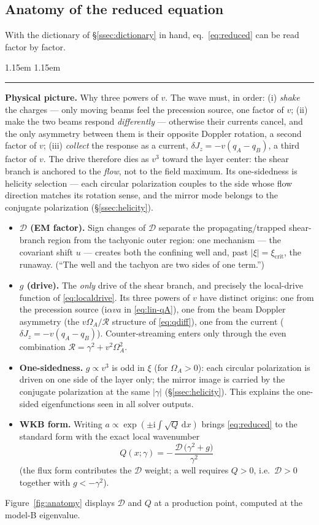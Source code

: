 \documentclass[11pt,a4paper]{article}
\numberwithin{equation}{section}
\theoremstyle{remark}
\newenvironment{intuition}%
{\par\medskip\noindent
 \begin{list}{}{\leftmargin 1.15em \rightmargin 1.15em \listparindent 0pt
 \itemindent 0pt \parsep 2pt \topsep 2pt}\item\relax
 \small\textcolor{intu}{\rule[-0.6ex]{2.6pt}{2.4ex}}\hspace{0.55em}%
 \textcolor{intu}{\textbf{Physical picture.}}\hspace{0.5em}\ignorespaces}%
{\end{list}\medskip}
\newcommand{\OmA}{\Omega_A}
\newcommand{\D}{\mathcal{D}}
\newcommand{\R}{\mathcal{R}}
\newcommand{\dd}{\mathrm{d}}
\newcommand{\ii}{\mathrm{i}}
\begin{document}
\subsection{Anatomy of the reduced equation}
\label{ssec:anatomy}

With the dictionary of \S\ref{ssec:dictionary} in hand,
eq.~\eqref{eq:reduced} can be read factor by factor.

\begin{intuition}
Why three powers of $v$. The wave must, in order: (i) \emph{shake} the
charges --- only moving beams feel the precession source, one factor of
$v$; (ii) make the two beams respond \emph{differently} --- otherwise
their currents cancel, and the only asymmetry between them is their
opposite Doppler rotation, a second factor of $v$; (iii) \emph{collect}
the response as a current, $\delta J_z=-v(q_A-q_B)$, a third factor of
$v$. The drive therefore dies as $v^3$ toward the layer center: the shear
branch is anchored to the \emph{flow}, not to the field maximum. Its
one-sidedness is helicity selection --- each circular polarization
couples to the side whose flow direction matches its rotation sense,
and the mirror mode belongs to the conjugate polarization
(\S\ref{ssec:helicity}).
\end{intuition}

\begin{itemize}
\item \textbf{$\D$ (EM factor).} Sign changes of $\D$ separate the
propagating/trapped shear-branch region from the tachyonic outer region:
one mechanism --- the covariant shift $u$ --- creates both the confining
well and, past $|\xi|=\xi_{\mathrm{crit}}$, the runaway. (``The well and
the tachyon are two sides of one term.'')
\item \textbf{$g$ (drive).} The \emph{only} drive of the shear branch, and
precisely the local-drive function of \eqref{eq:localdrive}. Its three
powers of $v$ have distinct origins: one from the precession source
($\ii\alpha va$ in \eqref{eq:lin-qA}), one from the beam Doppler asymmetry
(the $v\OmA/\R$ structure of \eqref{eq:qdiff}), one from the current
($\delta J_z=-v(q_A-q_B)$). Counter-streaming enters only through the even
combination $\R=\gamma^2+v^2\OmA^2$.
\item \textbf{One-sidedness.} $g\propto v^3$ is odd in $\xi$ (for
$\OmA>0$): each circular polarization is driven on one side of the layer
only; the mirror image is carried by the conjugate polarization at the
same $|\gamma|$ (\S\ref{ssec:helicity}). This explains the one-sided
eigenfunctions seen in all solver outputs.
\item \textbf{WKB form.} Writing $a\propto\exp(\pm\ii\int\!\sqrt{Q}\,\dd x)$
brings \eqref{eq:reduced} to the standard form with the exact local
wavenumber
\begin{equation}
\boxed{\;Q(x;\gamma)=-\,\frac{\D\,\bigl(\gamma^2+g\bigr)}{\gamma^2}\;}
\label{eq:Qexact}
\end{equation}
(the flux form contributes the $\D$ weight; a well requires $Q>0$, i.e.\
$\D>0$ together with $g<-\gamma^2$).
\end{itemize}
Figure~\ref{fig:anatomy} displays $\D$ and $Q$ at a production point,
computed at the model-B eigenvalue.
\end{document}
